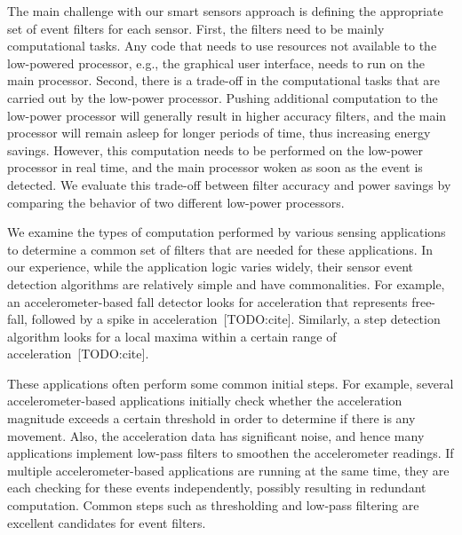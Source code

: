 The main challenge with our smart sensors approach is defining the
appropriate set of event filters for each sensor. First, the filters
need to be mainly computational tasks. Any code that needs to use
resources not available to the low-powered processor, e.g., the
graphical user interface, needs to run on the main processor. Second,
there is a trade-off in the computational tasks that are carried out
by the low-power processor. Pushing additional computation to the
low-power processor will generally result in higher accuracy filters,
and the main processor will remain asleep for longer periods of time,
thus increasing energy savings. However, this computation needs to be
performed on the low-power processor in real time, and the main
processor woken as soon as the event is detected. We evaluate this
trade-off between filter accuracy and power savings by comparing the
behavior of two different low-power processors.




We examine the types of computation performed by various sensing applications to
determine a common set of filters that are needed for these applications. In our
experience, while the application logic varies widely, their sensor event
detection algorithms are relatively simple and have commonalities. For example,
an accelerometer-based fall detector looks for acceleration that represents
free-fall, followed by a spike in acceleration~[TODO:cite]. Similarly, a step
detection algorithm looks for a local maxima within a certain range of
acceleration~[TODO:cite]. 

These applications often perform some common initial steps. For example, several
accelerometer-based applications initially check whether the acceleration
magnitude exceeds a certain threshold in order to determine if there is any
movement. Also, the acceleration data has significant noise, and hence many
applications implement low-pass filters to smoothen the accelerometer readings.
If multiple accelerometer-based applications are running at the same time, they
are each checking for these events independently, possibly resulting in
redundant computation. Common steps such as thresholding and low-pass filtering
are excellent candidates for event filters.

